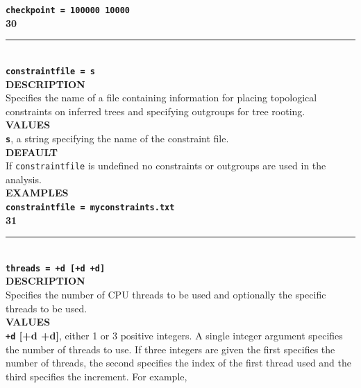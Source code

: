 \documentclass[a4paper]{book}
\numberwithin{equation}{section} \renewcommand{\baselinestretch}{0.55}
\begin{document}
\textbf{\texttt{checkpoint = 100000 10000}} \vspace{10pt}\\
\textbf{{\large 30}} \\
\noindent\rule{\textwidth}{0.8pt} \\
\textbf{{\Large \texttt{constraintfile = s}}} \vspace{5pt}\\
\textbf{DESCRIPTION} \vspace{5pt}\\
Specifies the name of a file containing information for placing
topological constraints on inferred trees and specifying outgroups for
tree rooting.
\vspace{5pt}\\
\textbf{VALUES} \vspace{5pt}\\
\textbf{\texttt{s}}, a string specifying the name of the constraint
file.
\vspace{5pt}\\
\textbf{DEFAULT} \vspace{5pt}\\
If \texttt{constraintfile} is undefined no constraints or outgroups
are used in the analysis.
\vspace{5pt}\\
\textbf{EXAMPLES} \vspace{5pt}\\
\textbf{\texttt{constraintfile = myconstraints.txt}} \vspace{5pt}\\
\textbf{{\large 31}} \\
\noindent\rule{\textwidth}{0.8pt} \\
\textbf{{\Large \texttt{threads = +d [+d +d]}}} \vspace{5pt}\\
\textbf{DESCRIPTION} \vspace{5pt}\\
Specifies the number of CPU threads to be used and optionally the specific threads
to be used.
\vspace{5pt}\\
\textbf{VALUES} \vspace{5pt}\\
\textbf{\texttt{+d} [+d +d]}, either 1 or 3 positive integers. A single integer argument specifies the number
of threads to use. If three integers are given the first specifies the number of threads, the second
specifies the index of the first thread used and the third specifies the increment. For example,
\end{document}
